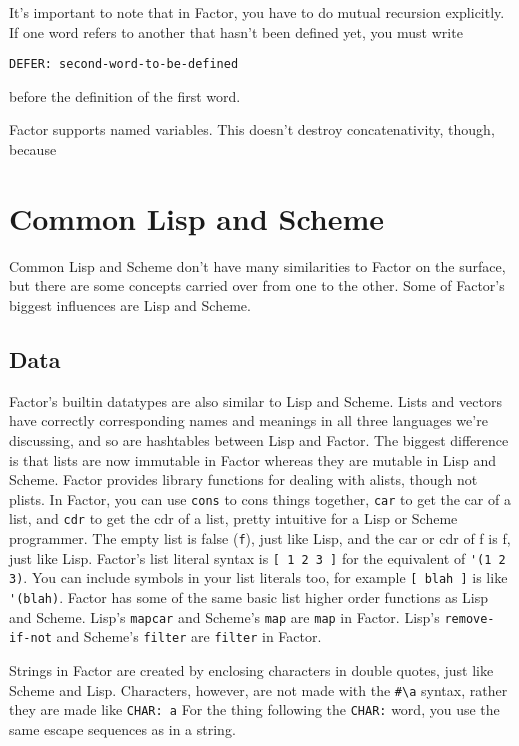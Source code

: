 \documentclass{article}
\begin{document}
It's important to note that in Factor, you have to do mutual recursion explicitly. If one word refers to another that hasn't been defined yet, you must write
\begin{verbatim}
DEFER: second-word-to-be-defined
\end{verbatim}
before the definition of the first word.

Factor supports named variables. This doesn't destroy concatenativity, though, because 

\section{Common Lisp and Scheme}

Common Lisp and Scheme don't have many similarities to Factor on the surface, but there are some concepts carried over from one to the other. Some of Factor's biggest influences are Lisp and Scheme.

\subsection{Data}

Factor's builtin datatypes are also similar to Lisp and Scheme. Lists and vectors have correctly corresponding names and meanings in all three languages we're discussing, and so are hashtables between Lisp and Factor. The biggest difference is that lists are now immutable in Factor whereas they are mutable in Lisp and Scheme. Factor provides library functions for dealing with alists, though not plists. In Factor, you can use \texttt{cons} to cons things together, \texttt{car} to get the car of a list, and \texttt{cdr} to get the cdr of a list, pretty intuitive for a Lisp or Scheme programmer. The empty list is false (\texttt{f}), just like Lisp, and the car or cdr of f is f, just like Lisp. Factor's list literal syntax is \verb|[ 1 2 3 ]| for the equivalent of \verb|'(1 2 3)|. You can include symbols in your list literals too, for example \verb|[ blah ]| is like \verb|'(blah)|. Factor has some of the same basic list higher order functions as Lisp and Scheme. Lisp's \texttt{mapcar} and Scheme's \texttt{map} are \texttt{map} in Factor. Lisp's \texttt{remove-if-not} and Scheme's \texttt{filter} are \texttt{filter} in Factor.


Strings in Factor are created by enclosing characters in double quotes, just like Scheme and Lisp. Characters, however, are not made with the \verb|#\a| syntax, rather they are made like \verb|CHAR: a| For the thing following the \texttt{CHAR:} word, you use the same escape sequences as in a string.
\end{document}
